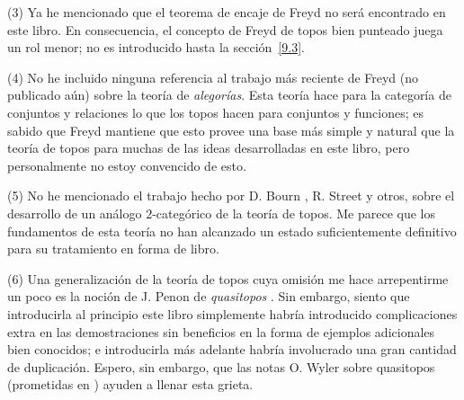 (3) Ya he mencionado que el teorema de encaje de Freyd \pend{[FK]} no será
encontrado en este libro. En consecuencia, el concepto de Freyd de topos bien
punteado juega un rol menor; no es introducido hasta la sección~\ref{9.3}.

(4) No he incluido ninguna referencia al trabajo más reciente de Freyd (no
publicado aún) sobre la teoría de \emph{alegorías}. Esta teoría hace para la
categoría de conjuntos y relaciones lo que los topos hacen para conjuntos y
funciones; es sabido que Freyd  mantiene que esto provee una base más simple y
natural que la teoría de topos para muchas de las ideas desarrolladas en este
libro, pero personalmente no estoy convencido de esto.

(5) No he mencionado el trabajo hecho por D. Bourn \pend{[13]}, R. Street
\pend{[113], [114]} y otros, sobre el desarrollo de un análogo \(2\)-categórico de
la teoría de topos. Me parece que los fundamentos de esta teoría no han
alcanzado un estado suficientemente definitivo para su tratamiento en forma de
libro.

(6) Una generalización de la teoría de topos cuya omisión me hace arrepentirme
un poco es la noción de J. Penon de \emph{quasitopos} \pend{[99]}. Sin embargo,
siento que introducirla al principio este libro simplemente habría introducido
complicaciones extra en las demostraciones sin beneficios en la forma de
ejemplos adicionales bien conocidos; e introducirla más adelante habría
involucrado una gran cantidad de duplicación. Espero, sin embargo, que las notas
O. Wyler sobre quasitopos (prometidas en \pend{[130]}) ayuden a llenar esta
grieta.

